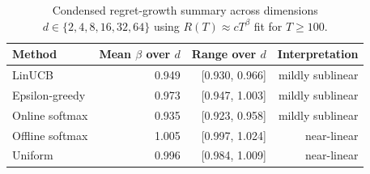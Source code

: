 \begin{table}[t]
\centering
\caption{Condensed regret-growth summary across dimensions $d\in\{2,4,8,16,32,64\}$ using $R(T)\approx cT^{\beta}$ fit for $T\geq100$.}
\label{tab:regret-beta-condensed}
\begin{tabular}{lrrr}
\toprule
Method & Mean $\beta$ over $d$ & Range over $d$ & Interpretation \\
\midrule
LinUCB & 0.949 & [0.930, 0.966] & mildly sublinear \\
Epsilon-greedy & 0.973 & [0.947, 1.003] & mildly sublinear \\
Online softmax & 0.935 & [0.923, 0.958] & mildly sublinear \\
Offline softmax & 1.005 & [0.997, 1.024] & near-linear \\
Uniform & 0.996 & [0.984, 1.009] & near-linear \\
\bottomrule
\end{tabular}
\end{table}
